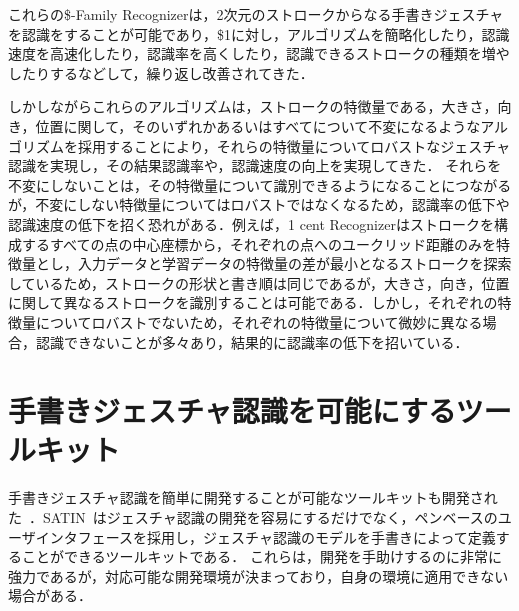 これらの\$-Family Recognizerは，2次元のストロークからなる手書きジェスチャを認識をすることが可能であり，\$1に対し，アルゴリズムを簡略化したり，認識速度を高速化したり，認識率を高くしたり，認識できるストロークの種類を増やしたりするなどして，繰り返し改善されてきた．

しかしながらこれらのアルゴリズムは，ストロークの特徴量である，大きさ，向き，位置に関して，そのいずれかあるいはすべてについて不変になるようなアルゴリズムを採用することにより，それらの特徴量についてロバストなジェスチャ認識を実現し，その結果認識率や，認識速度の向上を実現してきた．
それらを不変にしないことは，その特徴量について識別できるようになることにつながるが，不変にしない特徴量についてはロバストではなくなるため，認識率の低下や認識速度の低下を招く恐れがある．例えば，1 cent Recognizerはストロークを構成するすべての点の中心座標から，それぞれの点へのユークリッド距離のみを特徴量とし，入力データと学習データの特徴量の差が最小となるストロークを探索しているため，ストロークの形状と書き順は同じであるが，大きさ，向き，位置に関して異なるストロークを識別することは可能である．しかし，それぞれの特徴量についてロバストでないため，それぞれの特徴量について微妙に異なる場合，認識できないことが多々あり，結果的に認識率の低下を招いている．

\section{手書きジェスチャ認識を可能にするツールキット}
手書きジェスチャ認識を簡単に開発することが可能なツールキットも開発された~\cite{Henry:1990:IGS:97924.97938,Landay:1993:EEU:259964.260123,Myers:1997:AEN:262050.260628}．SATIN~\cite{Hong:2000:STI:354401.354412}はジェスチャ認識の開発を容易にするだけでなく，ペンベースのユーザインタフェースを採用し，ジェスチャ認識のモデルを手書きによって定義することができるツールキットである．
これらは，開発を手助けするのに非常に強力であるが，対応可能な開発環境が決まっており，自身の環境に適用できない場合がある．


